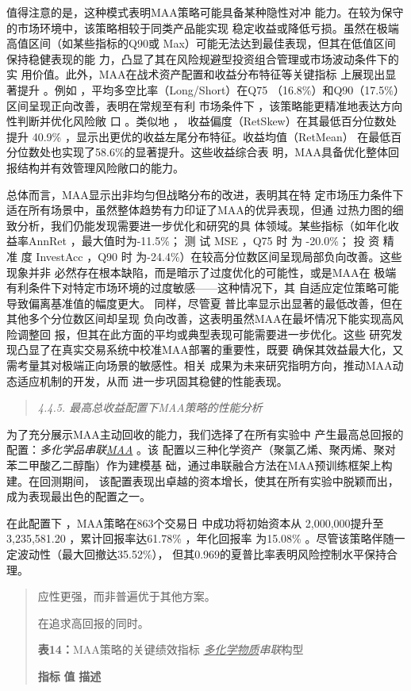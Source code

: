 值得注意的是，这种模式表明MAA策略可能具备某种隐性对冲
能力。在较为保守的市场环境中，该策略相较于同类产品能实现
稳定收益或降低亏损。虽然在极端高值区间（如某些指标的Q90或
Max）可能无法达到最佳表现，但其在低值区间保持稳健表现的能
力，凸显了其在风险规避型投资组合管理或市场波动条件下的实
用价值。此外，MAA在战术资产配置和收益分布特征等关键指标 上展现出显著提升
。例如 ，平均多空比率（Long/Short）在Q75
（16.8\%）和Q90（17.5\%）区间呈现正向改善，表明在常规至有利 市场条件下
，该策略能更精准地表达方向性判断并优化风险敞 口 。类似地 ，
收益偏度（RetSkew）在其最低百分位数处提升 40.9\%
，显示出更优的收益左尾分布特征。收益均值（RetMean）
在最低百分位数处也实现了58.6\%的显著提升。这些收益综合表
明，MAA具备优化整体回报结构并有效管理风险敞口的能力。

总体而言，MAA显示出非均匀但战略分布的改进，表明其在特
定市场压力条件下适在所有场景中，虽然整体趋势有力印证了MAA的优异表现，但通
过热力图的细致分析，我们仍能发现需要进一步优化和研究的具
体领域。某些指标（如年化收益率AnnRet ，最大值时为-11.5\%； 测 试 MSE
，Q75 时 为 -20.0\%； 投 资 精 准 度 InvestAcc ，Q90 时
为-24.4\%）在较高分位数区间呈现局部负向改善。这些现象并非
必然存在根本缺陷，而是暗示了过度优化的可能性，或是MAA在
极端有利条件下对特定市场环境的过度敏感------这种情况下，其
自适应定位策略可能导致偏离基准值的幅度更大。 同样，尽管夏
普比率显示出显著的最低改善，但在其他多个分位数区间却呈现
负向改善，这表明虽然MAA在最坏情况下能实现高风险调整回
报，但其在此方面的平均或典型表现可能需要进一步优化。这些
研究发现凸显了在真实交易系统中校准MAA部署的重要性，既要
确保其效益最大化，又需考量其对极端正向场景的敏感性。相关
成果为未来研究指明方向，推动MAA动态适应机制的开发，从而
进一步巩固其稳健的性能表现。

\begin{quote}
\emph{4.4.5. 最高总收益配置下MAA策略的性能分析}
\end{quote}

为了充分展示MAA主动回收的能力，我们选择了在所有实验中
产生最高总回报的配置：\emph{多化学品串联\ul{MAA}} 。该
配置以三种化学资产（聚氯乙烯、聚丙烯、聚对苯二甲酸乙二醇酯）作为建模基
础，通过串联融合方法在MAA预训练框架上构建。在回测期间，
该配置表现出卓越的资本增长，使其在所有实验中脱颖而出，成为表现最出色的配置之一。

在此配置下 ，MAA策略在863个交易日 中成功将初始资本从
2,000,000提升至3,235,581.20 ，累计回报率达61.78\% ，年化回报率 为15.08\%
。尽管该策略伴随一定波动性（最大回撤达35.52\%），
但其0.969的夏普比率表明风险控制水平保持合理。

\begin{quote}
应性更强，而非普遍优于其他方案。

在追求高回报的同时。

\textbf{表14：}MAA策略的关键绩效指标 \emph{\ul{多化学物质}串联}构型

\textbf{指标} \textbf{值} \textbf{描述}
\end{quote}


